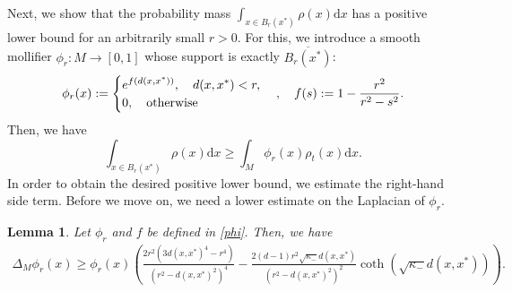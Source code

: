 \documentclass[11pt]{amsart}
\newtheorem{lemma}{Lemma}[section]
\def\d{\mathrm{d}}
\newcommand{\dm}{d} %
\newcommand{\dist}{d}%
\begin{document}
Next, we show that the probability mass $\int_{x\in B_r(x^*)} \rho(x) \d x $ has a positive lower bound for an arbitrarily small $r>0$. For this, we introduce a smooth mollifier $\phi_r: M \to [0,1]$ whose support is exactly $\overline{B_r(x^*)}$:
\begin{equation} \label{phi}
\phi_r(x) :=
\begin{cases}
\displaystyle e^{f(d(x,x^*))},\quad d(x,x^*)<r, \\
0,\quad \textup{otherwise}
\end{cases}, \quad f(s) := 1-\frac{r^2}{r^2 - s^2}.
\end{equation}
Then, we have
\[
\int_{x\in B_r(x^*)} \rho(x) \d x  \geq \int_M \phi_r(x) \rho_t(x) \d x .
\]
In order to obtain the desired positive lower bound, we estimate the right-hand side term. Before we move on, we need a  lower estimate on the Laplacian of $\phi_r$. 


 


\begin{lemma} \label{lem:lower}
Let $\phi_r$ and $f$ be defined in \eqref{phi}. Then, we have
\begin{align*}
\Delta_M \phi_r(x)\geq\phi_r(x)\left(\frac{2r^2(3\dist(x, x^*)^4-r^4)}{(r^2-\dist(x, x^*)^2)^4}-\frac{2(\dm-1)r^2\sqrt{\kappa_-}\dist(x, x^*)}{(r^2-\dist(x, x^*)^2)^2}
\coth\left(\sqrt{\kappa_-}\dist(x, x^*)\right)\right).
\end{align*}
\end{lemma}
\end{document}

